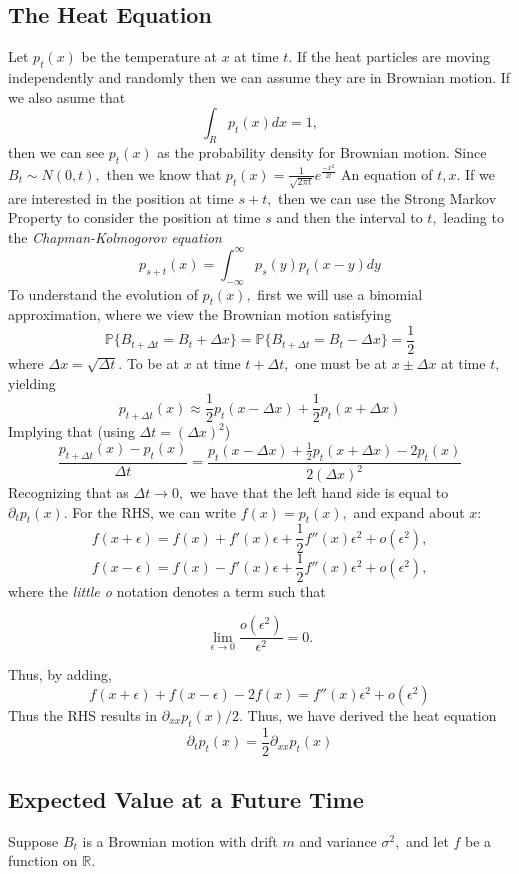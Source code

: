 \documentclass[oneside]{book}
\newcommand{\bbP}{\mathbb{P}}
\newcommand{\bbR}{\mathbb{R}}
\begin{document}
\subsection{The Heat Equation}
Let $p_t(x)$ be the temperature at $x$ at time $t.$ If the heat particles are moving independently and randomly then we can assume they are in Brownian motion. If we also asume that 
\[\int_R p_t(x)dx = 1,\] then we can see $p_t(x)$ as the probability density for Brownian motion. Since $B_t \sim N(0,t),$ then we know that 
$p_t(x) = \frac{1}{\sqrt{2\pi t}}e^\frac{-x^2}{2t}$
An equation of $t,x.$ If we are interested in the position at time $s+t,$ then we can use the Strong Markov Property to consider the position at time $s$ and then the interval to $t,$ leading to the \textit{Chapman-Kolmogorov equation}
\[p_{s+t}(x) = \int_{-\infty}^\infty p_s(y)p_t(x-y)dy\]
To understand the evolution of $p_t(x),$ first we will use a binomial approximation, where we view the Brownian motion satisfying
\[\bbP\{B_{t + \Delta t} = B_t + \Delta x\} = \bbP\{B_{t + \Delta t} = B_t - \Delta x\} = \frac{1}{2}\] where $\Delta x = \sqrt{\Delta t}.$\newline
To be at $x$ at time $t + \Delta t,$ one must be at $x \pm \Delta x$ at time $t,$ yielding
\[p_{t + \Delta t}(x)\approx \frac{1}{2}p_{t}(x - \Delta x) + \frac{1}{2}p_t(x  + \Delta x)\] Implying that (using $\Delta t = (\Delta x)^2$)
\[\frac{p_{t + \Delta t}(x) - p_t(x)}{\Delta t} = \frac{p_{t}(x - \Delta x) + \frac{1}{2}p_t(x  + \Delta x) - 2p_t(x)}{2(\Delta x)^2}\]  Recognizing that as $\Delta t \to 0,$ we have that 
the left hand side is equal to $\partial_tp_t(x).$ For the RHS, we can write $f(x) = p_t(x),$ and expand about $x:$
\[f(x + \epsilon) = f(x) + f'(x)\epsilon + \frac{1}{2}f''(x)\epsilon^2 + o(\epsilon^2),\]
\[f(x - \epsilon) = f(x) - f'(x)\epsilon + \frac{1}{2}f''(x)\epsilon^2 + o(\epsilon^2),\]
where the \textit{little o} notation denotes a term such that 

\[\lim\limits_{\epsilon\to 0}\frac{o(\epsilon^2)}{\epsilon^2} = 0.\]

Thus, by adding, 
\[f(x + \epsilon) + f(x-\epsilon) - 2f(x) = f''(x)\epsilon^2 + o(\epsilon^2)\]
Thus the RHS results in $\partial_{xx}p_t(x)/2.$ Thus, we have derived the heat equation
\[\partial_tp_t(x) = \frac{1}{2}\partial_{xx}p_t(x)\]


\subsection{Expected Value at a Future Time}
Suppose $B_t$ is a Brownian motion with drift $m$ and variance $\sigma^2,$ and let $f$ be a function on $\bbR.$ 
\end{document}
